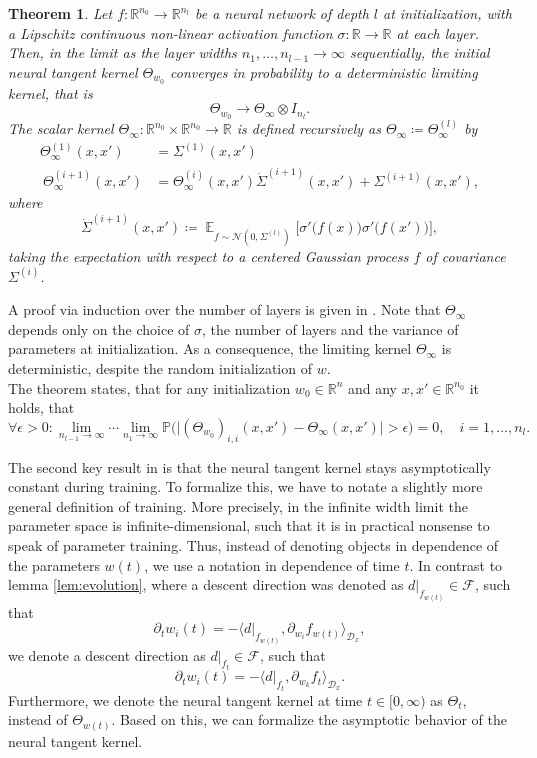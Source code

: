 \documentclass[11pt, a4paper]{article}
\newtheorem{theorem}{Theorem}[section]
\newcommand{\R}{\mathbb{R}}
\newcommand{\D}{\mathcal{D}}
\newcommand{\F}{\mathcal{F}}
\DeclareMathOperator*{\E}{\mathbb{E}}
\begin{document}
\begin{theorem}
Let $f: \R^{n_0} \to \R^{n_l}$ be a neural network of depth $l$ at initialization, with a Lipschitz continuous non-linear activation function $\sigma: \R \to \R$ at each layer. Then, in the limit as the layer widths $n_1, \dots, n_{l-1} \to \infty$ sequentially, the initial neural tangent kernel $\Theta_{w_0}$ converges in probability to a deterministic limiting kernel, that is
\[ \Theta_{w_0} \to \Theta_{\infty} \otimes I_{n_l}. \]
The scalar kernel $\Theta_{\infty} : \R^{n_0} \times \R^{n_0} \to \R$ is defined recursively as $\Theta_{\infty} \coloneq \Theta_{\infty}^{(l)}$ by
\[ \begin{split} 
\Theta_{\infty}^{(1)} (x,x') &= \Sigma^{(1)}(x,x') \\\
\Theta_{\infty}^{(i+1)}(x,x') &= \Theta_{\infty}^{(i)}(x,x') \dot{\Sigma}^{(i+1)}(x,x') + \Sigma^{(i+1)}(x,x'),
\end{split} \]
where 
\[ \dot{\Sigma}^{(i+1)}(x,x') \coloneq \E_{f \sim \mathcal{N}(0, \Sigma^{(l)})} \Big [ \sigma' \big ( f(x) \big ) \sigma' \big ( f(x') \big) \Big ], \]
taking the expectation with respect to a centered Gaussian process $f$ of covariance $\Sigma^{(i)}$.
\end{theorem}

A proof via induction over the number of layers is given in \cite{NTK}. Note that $\Theta_{\infty}$ depends only on the choice of $\sigma$, the number of layers and the variance of parameters at initialization. As a consequence, the limiting kernel $\Theta_{\infty}$ is deterministic, despite the random initialization of $w$. \\

The theorem states, that for any initialization $w_0 \in \R^n$ and any  $x,x' \in \R^{n_0}$ it holds, that
\[ \forall \epsilon > 0 : \lim_{n_{l-1} \to \infty} \cdots \lim_{n_1 \to \infty} \mathbb{P} \Big ( \big | (\Theta_{w_0})_{i,i}(x,x') - \Theta_{\infty}(x,x') \big | > \epsilon \Big ) = 0, \quad i=1, \dots, n_l. \]

The second key result in \cite{NTK} is that the neural tangent kernel stays asymptotically constant during training. To formalize this, we have to notate a slightly more general definition of training. More precisely, in the infinite width limit the parameter space is infinite-dimensional, such that it is in practical nonsense to speak of parameter training. Thus, instead of denoting objects in dependence of the parameters $w(t)$, we use a notation in dependence of time $t$. In contrast to lemma \ref{lem:evolution}, where a descent direction was denoted as $d|_{f_{w(t)}} \in \F$, such that 
\[ \partial_tw_i(t) = - \big \langle d|_{f_{w(t)}}, \partial_{w_i} f_{w(t)} \big \rangle_{\D_x}, \]
we denote a descent direction as $d|_{f_t} \in \F$, such that
\[ \partial_tw_i(t) = - \big \langle d|_{f_t}, \partial_{w_k} f_t \big \rangle_{\D_x}. \]
Furthermore, we denote the neural tangent kernel at time $t \in [0, \infty)$ as $\Theta_t$, instead of $\Theta_{w(t)}$. Based on this, we can formalize the asymptotic behavior of the neural tangent kernel.
\end{document}
